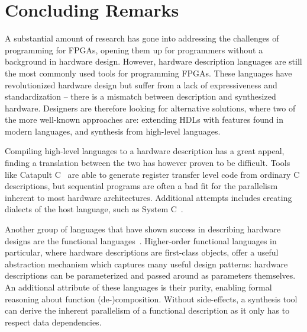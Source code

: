 \documentclass[../paper.tex]{subfiles}
\begin{document}
\chapter{Concluding Remarks}
\label{related}

A substantial amount of research has gone into addressing the challenges of programming for FPGAs, opening them up for programmers without a background in hardware design. However, hardware description languages are still the most commonly used tools for programming FPGAs. These languages have revolutionized hardware design but suffer from a lack of expressiveness and standardization -- there is a mismatch between description and synthesized hardware. Designers are therefore looking for alternative solutions, where two of the more well-known approaches are: extending HDLs with features found in modern languages, and synthesis from high-level languages.

Compiling high-level languages to a hardware description has a great appeal, finding a translation between the two has however proven to be difficult. Tools like Catapult C~\cite{graphics2008} are able to generate register transfer level code from ordinary C descriptions, but sequential programs are often a bad fit for the parallelism inherent to most hardware architectures. Additional attempts includes creating dialects of the host language, such as System C~\cite{ghenassia2005}.

Another group of languages that have shown success in describing hardware designs are the functional languages~\cite{sheeran2005}. Higher-order functional languages in particular, where hardware descriptions are first-class objects, offer a useful abstraction mechanism which captures many useful design patterns: hardware descriptions can be parameterized and passed around as parameters themselves. An additional attribute of these languages is their purity, enabling formal reasoning about function (de-)composition. Without side-effects, a synthesis tool can derive the inherent parallelism of a functional description as it only has to respect data dependencies.
\end{document}
